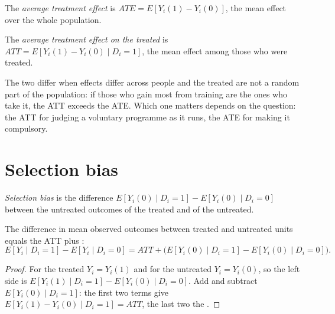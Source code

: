 \begin{definition}\label{def:b2:causality-and-experiments:ate}
The \emph{average treatment effect} is $\mathit{ATE} = E[Y_i(1) - Y_i(0)]$, the mean
effect over the whole population.
\end{definition}

\begin{definition}\label{def:b2:causality-and-experiments:att}
The \emph{average treatment effect on the treated} is $\mathit{ATT} =
E[Y_i(1) - Y_i(0) \mid D_i = 1]$, the mean effect among those who were treated.
\end{definition}

The two differ when effects differ across people and the treated are not a random part of the population: if those who
gain most from training are the ones who take it, the ATT exceeds the ATE. Which one matters depends on the question: the
ATT for judging a voluntary programme as it runs, the ATE for making it compulsory.

\section{Selection bias}\label{sec:b2:causality-and-experiments:selection}

\begin{definition}\label{def:b2:causality-and-experiments:selection-bias}
\emph{Selection bias} is the difference $E[Y_i(0) \mid D_i = 1] - E[Y_i(0) \mid D_i = 0]$ between
the untreated outcomes of the treated and of the untreated.
\end{definition}

\begin{proposition}\label{prop:b2:causality-and-experiments:decomposition}
The difference in mean observed outcomes between treated and untreated units equals the ATT plus :
\[
E[Y_i \mid D_i = 1] - E[Y_i \mid D_i = 0] = \mathit{ATT} + \bigl(E[Y_i(0) \mid D_i = 1] - E[Y_i(0) \mid D_i = 0]\bigr).
\]
\end{proposition}

\begin{proof}
For the treated $Y_i = Y_i(1)$ and for the untreated $Y_i = Y_i(0)$, so the left side is $E[Y_i(1) \mid D_i = 1] -
E[Y_i(0) \mid D_i = 0]$. Add and subtract $E[Y_i(0) \mid D_i = 1]$: the first two terms give $E[Y_i(1) - Y_i(0) \mid D_i =
1] = \mathit{ATT}$, the last two the .
\end{proof}

